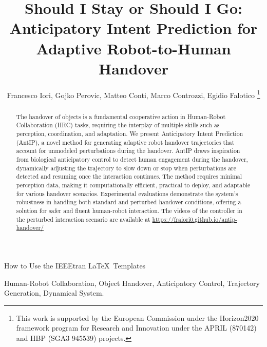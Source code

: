 \documentclass[lettersize,journal]{IEEEtran}
\begin{document}
\title{Should I Stay or Should I Go: Anticipatory Intent Prediction for Adaptive Robot-to-Human Handover}

\author{Francesco Iori, Gojko Perovic, Matteo Conti, Marco Controzzi, Egidio Falotico
\thanks{This work is supported by the European Commission under the Horizon2020 framework program for Research and Innovation under the APRIL (870142) and HBP (SGA3 945539) projects.}}


%
{How to Use the IEEEtran \LaTeX \ Templates}

\maketitle

\begin{abstract}
The handover of objects is a fundamental cooperative action in Human-Robot Collaboration (HRC) tasks, requiring the interplay of multiple skills such as perception, coordination, and adaptation.
We present Anticipatory Intent Prediction (AntIP), a novel method for generating adaptive robot handover trajectories that account for unmodeled perturbations during the handover.
AntIP draws inspiration from biological anticipatory control to detect human engagement during the handover, dynamically adjusting the trajectory to slow down or stop when perturbations are detected and resuming once the interaction continues. The method requires minimal perception data, making it computationally efficient, practical to deploy, and adaptable for various handover scenarios. Experimental evaluations demonstrate the system's robustness in handling both standard and perturbed handover conditions,  offering a solution for safer and fluent human-robot interaction.
The videos of the controller in the perturbed interaction scenario are available at \url{https://fraiori0.github.io/antip-handover/}
\end{abstract}

\begin{IEEEkeywords}
Human-Robot Collaboration, Object Handover, Anticipatory Control, Trajectory Generation, Dynamical System.
\end{IEEEkeywords}
\end{document}
